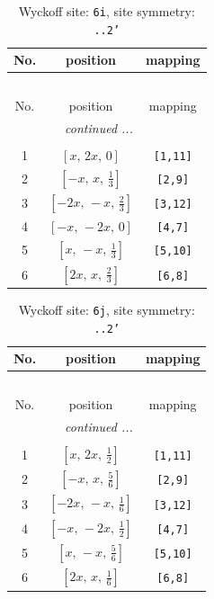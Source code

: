 \documentclass[fleqn,8pt]{jsarticle}
\begin{document}
\renewcommand{\arraystretch}{1.2}
\begin{longtable}{ccc}
\caption{Wyckoff site: {\tt 6i}, site symmetry: {\tt ..2'}}
 \\
 \hline \hline
No. & position & mapping \\ \hline \endfirsthead

\multicolumn{2}{l}{\tablename\ \thetable{}} \\
 \hline \hline
No. & position & mapping \\ \hline \endhead

 \hline \hline
\multicolumn{2}{r}{\footnotesize\it continued ...} \\ \endfoot

 \hline \hline
\multicolumn{2}{r}{} \\ \endlastfoot

1 & $\left[ x,\, 2 x,\, 0 \right]$ & {\tt [1,11]} \\ \hline
2 & $\left[ - x,\, x,\, \frac{1}{3} \right]$ & {\tt [2,9]} \\ \hline
3 & $\left[ - 2 x,\, - x,\, \frac{2}{3} \right]$ & {\tt [3,12]} \\ \hline
4 & $\left[ - x,\, - 2 x,\, 0 \right]$ & {\tt [4,7]} \\ \hline
5 & $\left[ x,\, - x,\, \frac{1}{3} \right]$ & {\tt [5,10]} \\ \hline
6 & $\left[ 2 x,\, x,\, \frac{2}{3} \right]$ & {\tt [6,8]} \\
\end{longtable}
\renewcommand{\arraystretch}{1.2}
\begin{longtable}{ccc}
\caption{Wyckoff site: {\tt 6j}, site symmetry: {\tt ..2'}}
 \\
 \hline \hline
No. & position & mapping \\ \hline \endfirsthead

\multicolumn{2}{l}{\tablename\ \thetable{}} \\
 \hline \hline
No. & position & mapping \\ \hline \endhead

 \hline \hline
\multicolumn{2}{r}{\footnotesize\it continued ...} \\ \endfoot

 \hline \hline
\multicolumn{2}{r}{} \\ \endlastfoot

1 & $\left[ x,\, 2 x,\, \frac{1}{2} \right]$ & {\tt [1,11]} \\ \hline
2 & $\left[ - x,\, x,\, \frac{5}{6} \right]$ & {\tt [2,9]} \\ \hline
3 & $\left[ - 2 x,\, - x,\, \frac{1}{6} \right]$ & {\tt [3,12]} \\ \hline
4 & $\left[ - x,\, - 2 x,\, \frac{1}{2} \right]$ & {\tt [4,7]} \\ \hline
5 & $\left[ x,\, - x,\, \frac{5}{6} \right]$ & {\tt [5,10]} \\ \hline
6 & $\left[ 2 x,\, x,\, \frac{1}{6} \right]$ & {\tt [6,8]} \\
\end{longtable}
\end{document}
